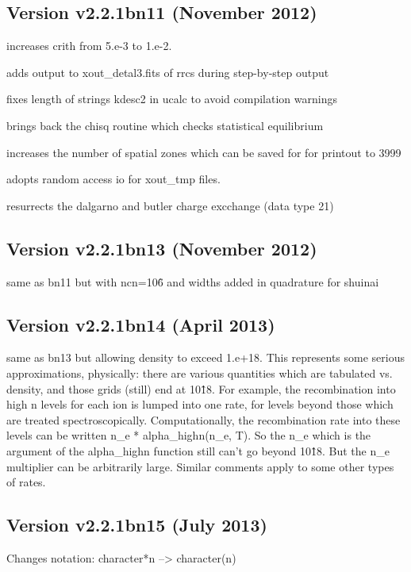 \subsection{Version v2.2.1bn11 (November 2012)}

increases crith from 5.e-3 to 1.e-2.

adds output to xout\_detal3.fits of rrcs during step-by-step output

fixes length of strings kdesc2 in ucalc to avoid compilation warnings

brings back the chisq routine which checks statistical equilibrium

increases the number of spatial zones which can be saved for 
for printout to 3999

adopts random access io for xout\_tmp files.

resurrects the dalgarno and butler charge excchange (data type 21) 

\subsection{Version v2.2.1bn13 (November 2012)}

same as bn11 but with ncn=10\^6 and widths added in quadrature for shuinai

\subsection{Version v2.2.1bn14 (April 2013)}

same as bn13 but allowing density to exceed 1.e+18.  This represents 
some serious approximations, physically:  there are various quantities which are
tabulated vs. density, and those grids (still) end at 10\^18.  For example, the
recombination into high n levels for each ion is lumped into one rate, for
levels beyond those which are treated spectroscopically.  Computationally,
the recombination rate into these levels can be written n\_e * alpha\_highn(n\_e, T).
So the n\_e which is the argument of the alpha\_highn function still can't go
beyond 10\^18.  But the n\_e multiplier can be arbitrarily large.  Similar comments
apply to some other types of rates.

\subsection{Version v2.2.1bn15 (July 2013)}


Changes notation:  character*n --> character(n)

